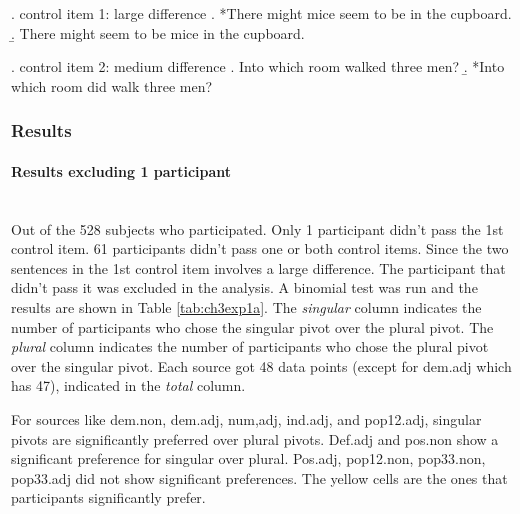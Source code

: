 \documentclass[
  11pt          %
  ,letterpaper  %
  ,center       %
  ,noupper      %
  ]{uconnthesis2}
\begin{document}
\ex. control item 1: large difference
\a. *There might mice seem to be in the cupboard.
\b. There might seem to be mice in the cupboard.

\ex. control item 2: medium difference
\a. Into which room walked three men?
\b. *Into which room did walk three men?

\subsubsection{Results}

\paragraph{Results excluding 1 participant}~\\

Out of the 528 subjects who participated. Only 1 participant didn't pass the 1st control item. 61 participants didn't pass one or both control items. Since the two sentences in the 1st control item involves a large difference. The participant that didn't pass it was excluded in the analysis. A binomial test was run and the results are shown in Table \ref{tab:ch3exp1a}. The \textit{singular} column indicates the number of participants who chose the singular pivot over the plural pivot. The \textit{plural} column indicates the number of participants who chose the plural pivot over the singular pivot. Each source got 48 data points (except for dem.adj which has 47), indicated in the \textit{total} column. 

For sources like dem.non, dem.adj, num,adj, ind.adj, and pop12.adj, singular pivots are significantly preferred over plural pivots. Def.adj and pos.non show a significant preference for singular over plural. Pos.adj, pop12.non, pop33.non, pop33.adj did not show significant preferences. The yellow cells are the ones that participants significantly prefer.
\end{document}
